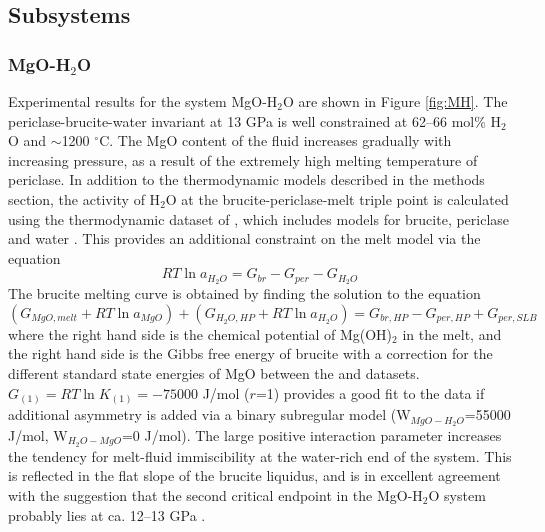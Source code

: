\documentclass[review]{elsarticle}
\begin{document}
\subsection{Subsystems}
\subsubsection{MgO-H$_2$O}
Experimental results for the system MgO-H$_2$O are shown in Figure \ref{fig:MH}. The periclase-brucite-water invariant at 13 GPa is well constrained at 62--66 mol\% H$_2$O and $\sim$1200 $^{\circ}$C. The MgO content of the fluid increases gradually with increasing pressure, as a result of the extremely high melting temperature of periclase. In addition to the thermodynamic models described in the methods section, the activity of H$_2$O at the brucite-periclase-melt triple point is calculated using the thermodynamic dataset of \citep{HP2011}, which includes models for brucite, periclase and water \citep{PS1995}. This provides an additional constraint on the melt model via the equation
\begin{equation}
RT \ln a_{H_2O} =  G_{br} - G_{per} - G_{H_2O}
\end{equation}
The brucite melting curve is obtained by finding the solution to the equation
\begin{equation}
(G_{MgO, melt} + RT \ln a_{MgO}) + (G_{H_2O, HP} + RT \ln a_{H_2O}) = G_{br, HP} - G_{per, HP} + G_{per, SLB}
\end{equation}
\noindent where the right hand side is the chemical potential of Mg(OH)$_2$ in the melt, and the right hand side is the Gibbs free energy of brucite with a correction for the different standard state energies of MgO between the \cite{HP2011} and \cite{SLB2011} datasets. $G_{(1)} = RT \ln K_{(1)} = -75000$ J/mol ($r$=1) provides a good fit to the data if additional asymmetry is added via a binary subregular model (W$_{MgO-H_2O}$=55000 J/mol, W$_{H_2O-MgO}$=0 J/mol). The large positive interaction parameter increases the tendency for melt-fluid immiscibility at the water-rich end of the system. This is reflected in the flat slope of the brucite liquidus, and is in excellent agreement with the suggestion that the second critical endpoint in the MgO-H$_2$O system probably lies at ca. 12--13 GPa \citep{MSUP2007}.
\end{document}
